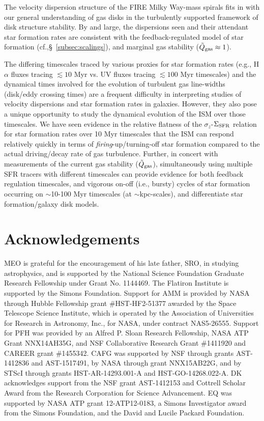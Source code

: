 \documentclass[usletter,fleqn,usenatbib]{mnras}
\begin{document}
The velocity dispersion structure of the FIRE Milky Way-mass spirals fits in with our general understanding of gas disks in the turbulently supported framework of disk structure stability.  By and large, the dispersions seen and their attendant star formation rates are consistent with the feedback-regulated model of star formation (cf.,\S~\ref{subsec:scalings}), and marginal gas stability ($\tilde Q_{\rm gas} \approx 1$).

The differing timescales traced by various proxies for star formation rates (e.g., H$\alpha$ fluxes tracing $\lesssim 10$ Myr vs. UV fluxes tracing $\lesssim 100$ Myr timescales) and the dynamical times involved for the evolution of turbulent gas line-widths (disk/eddy crossing times) are a frequent difficulty in interpreting studies of velocity dispersions and star formation rates in galaxies.  However, they also pose a unique opportunity to study the dynamical evolution of the ISM over those timescales.  We have seen evidence in the relative flatness of the $\sigma_z$-$\Sigma_{\rm SFR}$ relation for star formation rates over 10 Myr timescales that the ISM can respond relatively quickly in terms of \emph{firing}-up/turning-off star formation compared to the actual driving/decay rate of gas turbulence.  Further, in concert with measurements of the current gas stability ($\tilde Q_{\rm gas}$), simultaneously using multiple SFR tracers with different timescales can provide evidence for both feedback regulation timescales, and vigorous on-off (i.e., bursty) cycles of star formation occurring on $\sim$10-100 Myr timescales (at $\sim$kpc-scales), and differentiate star formation/galaxy disk models. 



\section*{Acknowledgements}

MEO is grateful for the encouragement of his late father, SRO, in studying astrophysics, and is supported by the National Science Foundation Graduate Research Fellowship under Grant No. 1144469.  The Flatiron Institute is supported by the Simons Foundation.  Support for AMM is provided by NASA through Hubble Fellowship grant \#HST-HF2-51377 awarded by the Space Telescope Science Institute, which is operated by the Association of Universities for Research in Astronomy, Inc., for NASA, under contract NAS5-26555.  Support for PFH was provided by an Alfred P. Sloan Research Fellowship, NASA ATP Grant NNX14AH35G, and NSF Collaborative Research Grant \#1411920 and CAREER grant \#1455342. CAFG was supported by NSF through grants AST-1412836 and AST-1517491, by NASA through grant NNX15AB22G, and by STScI through grants HST-AR-14293.001-A and HST-GO-14268.022-A. DK acknowledges support from the NSF grant AST-1412153 and Cottrell Scholar Award from the Research Corporation for Science Advancement. EQ was supported by NASA ATP grant 12-ATP12-0183, a Simons Investigator award from the Simons Foundation, and the David and Lucile Packard Foundation.
\end{document}
